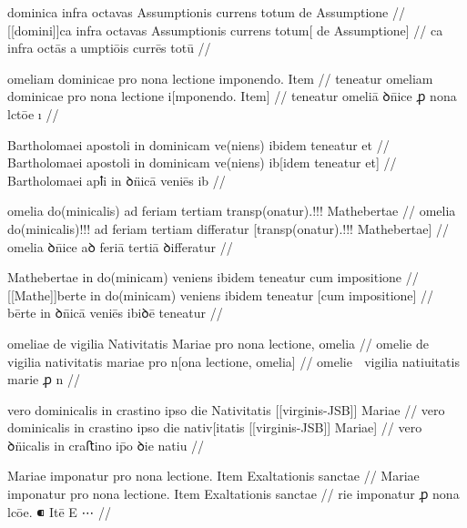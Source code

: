 \ex \bg
\gla
{}
dominica infra octavas Assumptionis currens totum de Assumptione 
//
\glRekonstrukcja
{}
[[domini]]ca infra octavas Assumptionis currens totum[ de Assumptione] 
//
\glU
{}
ca infra octās aumptiōis currēs totū  
//
\endgl
\xe


\ex \bg
\gla
{}
{} omeliam dominicae pro nona lectione imponendo.
Item 
//
\glRekonstrukcja
{}
teneatur   omeliam dominicae pro nona lectione i[mponendo.
Item]
//
\glU
{}
teneatur   omeliā ꝺn̄ice ꝓ nona lctōe ı 
//
\endgl
\xe



\ex \bg
\gla
{}
Bartholomaei apostoli in dominicam ve(niens) ibidem teneatur et 
//
\glRekonstrukcja
{}
Bartholomaei apostoli in dominicam ve(niens) ib[idem teneatur et] 
//
\glU
{}
Bartholomaei apꝉi in ꝺn̈icā veniēs ib  
//
\endgl
\xe



\ex \bg
\gla
{}
omelia do(minicalis) ad feriam tertiam {} transp(onatur).!!!
Mathebertae
//
\glRekonstrukcja
{}
omelia do(minicalis)!!! ad feriam tertiam differatur [transp(onatur).!!!
Mathebertae]
//
\glU
{}
omelia ꝺn̄ice aꝺ feriā tertiā ꝺiﬀeratur  
//
\endgl
\xe



\ex \bg
\gla
{}
Mathebertae in do(minicam) veniens ibidem teneatur  cum impositione
//
\glRekonstrukcja
{}
[[Mathe]]berte in do(minicam) veniens ibidem teneatur  [cum impositione]
//
\glU
{}
bērte in ꝺn̄icā veniēs ibiꝺē teneatur   
//
\endgl
\xe



\ex \bg
\gla
{}
omeliae de vigilia Nativitatis Mariae pro nona lectione, omelia
//
\glRekonstrukcja
{}
omelie de vigilia nativitatis mariae pro n[ona lectione, omelia]
//
\glU
{}
omelie  vigilia natiuitatis marie ꝓ n  
//
\endgl
\xe



\ex \bg
\gla
{}
vero dominicalis in crastino ipso die Nativitatis [[virginis-JSB]] Mariae
//
\glRekonstrukcja
{}
vero dominicalis in crastino ipso die nativ[itatis [[virginis-JSB]] Mariae]
//
\glU
{}
vero ꝺn̈icalis in craﬅino ip̄o ꝺie natiu  
//
\endgl
\xe



\ex \bg
\gla
{}
Mariae imponatur pro
nona lectione.
Item Exaltationis sanctae
//
\glRekonstrukcja
{}
Mariae imponatur pro
nona lectione.
Item Exaltationis sanctae
//
\glU
{}
rie imponatur ꝓ nona lcōe. ⁌ Itē E ⋯
//
\endgl
\xe



